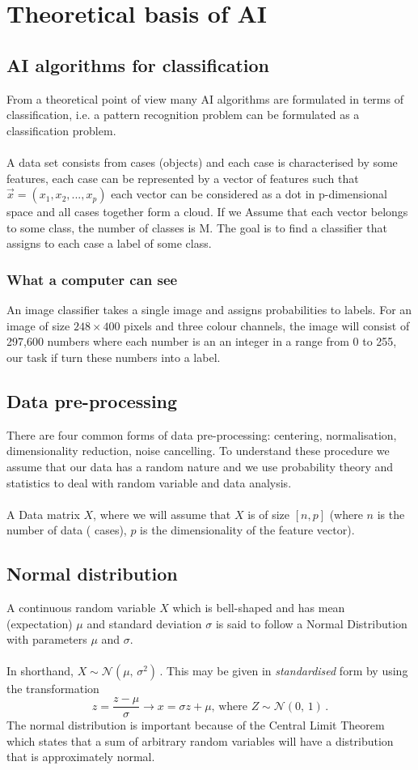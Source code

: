 \section{Theoretical basis of AI}
\subsection{AI algorithms for classification}
From a theoretical point of view many AI algorithms are formulated in terms of classification, i.e. a pattern recognition problem can be formulated as a classification problem. 
\\\\
A data set consists from cases (objects) and each case is characterised by some features, each case can be represented by a vector of features such that $\overrightarrow{x} = (x_1,x_2,...,x_p)$  each vector can be considered as a dot in p-dimensional space and all cases together form a cloud. If we Assume that each vector belongs to some class, the number of classes is M. The goal is to find a classifier that assigns to each case a label of some class.
\subsubsection{What a computer can see}
An image classifier takes a single image and assigns probabilities to labels. For an image of size $248\times400$ pixels and three colour channels, the image will consist of 297,600 numbers where each number is an an integer in a range from 0 to 255, our task if turn these numbers into a label.
\subsection{Data pre-processing}
There are four common forms of data pre-processing: centering, normalisation, dimensionality reduction, noise cancelling. To understand these procedure we assume that our data has a random nature and we use probability theory and statistics to deal with random variable and data analysis. 
\\\\
A Data matrix $X$, where we will assume that $X$ is of size $[n,p]$ (where $n$ is the number of data ( cases), $p$ is the dimensionality of the feature vector).

\subsection{Normal distribution}
A continuous random variable $X$ which is bell-shaped and has mean (expectation) $\mu$ and standard deviation $\sigma$ is said to follow a Normal Distribution with
parameters $\mu$ and $\sigma$.
\\\\
In shorthand, $X \sim \mathcal{N}(\mu,\,\sigma^{2})\,.$
This may be given in \emph{standardised} form by using the transformation
\begin{equation}
    z = \frac{z - \mu}{\sigma} \rightarrow x = \sigma z+ \mu \text{, where } Z \sim \mathcal{N}(0,\,1)\,.
\end{equation}
The normal distribution is important because of the Central Limit Theorem which states that a sum of arbitrary random variables will have a distribution that is approximately normal. 

